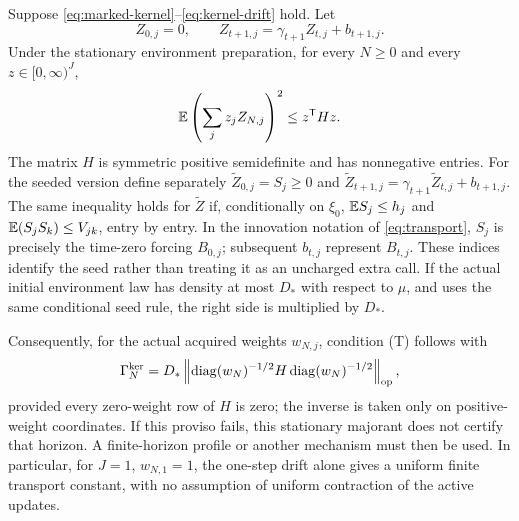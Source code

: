 \begin{theorem}\label{thm:kernel}
Suppose \eqref{eq:marked-kernel}--\eqref{eq:kernel-drift} hold. Let
\[
 Z_{0,j}=0,\qquad Z_{t+1,j}=\gamma_{t+1}Z_{t,j}+b_{t+1,j}.
\]
Under the stationary environment preparation, for every $N\ge0$ and every $z\in[0,\infty)^J$,
\begin{equation}\label{eq:kernel-energy}
 \mathbb E\left(\sum_j z_jZ_{N,j}\right)^2\le z^{\mathsf T}Hz.
\end{equation}
The matrix $H$ is symmetric positive semidefinite and has nonnegative entries. For the seeded version define separately $\widetilde Z_{0,j}=S_j\ge0$ and $\widetilde Z_{t+1,j}=\gamma_{t+1}\widetilde Z_{t,j}+b_{t+1,j}$. The same inequality holds for $\widetilde Z$ if, conditionally on $\xi_0$, $\mathbb E S_j\le h_j$ and $\mathbb E(S_jS_k)\le V_{jk}$, entry by entry. In the innovation notation of \eqref{eq:transport}, $S_j$ is precisely the time-zero forcing $B_{0,j}$; subsequent $b_{t,j}$ represent $B_{t,j}$. These indices identify the seed rather than treating it as an uncharged extra call. If the actual initial environment law has density at most $D_*$ with respect to $\mu$, and uses the same conditional seed rule, the right side is multiplied by $D_*$.

Consequently, for the actual acquired weights $w_{N,j}$, condition \textup{(T)} follows with
\begin{equation}\label{eq:resolvent-gamma}
 \Gamma_N^{\rm ker}
   =D_*\left\|\operatorname{diag}(w_N)^{-1/2}
                    H\operatorname{diag}(w_N)^{-1/2}\right\|_{\rm op},
\end{equation}
provided every zero-weight row of $H$ is zero; the inverse is taken only on positive-weight coordinates. If this proviso fails, this stationary majorant does not certify that horizon. A finite-horizon profile or another mechanism must then be used. In particular, for $J=1$, $w_{N,1}=1$, the one-step drift alone gives a uniform finite transport constant, with no assumption of uniform contraction of the active updates.
\end{theorem}
